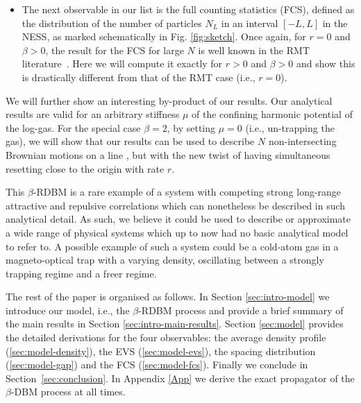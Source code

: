\documentclass[onecolumn,superscriptaddress,
 amsmath,amssymb,
 aps,
 prd,
]{revtex4-1}
\begin{document}
\begin{itemize}
\item The next observable in our list is the full counting statistics (FCS), defined as the distribution of the number of particles $N_L$ in an interval $[-L,L]$ 
in the NESS, as marked schematically in Fig. \ref{fig:sketch}. Once again, for $r=0$ and $\beta >0$, the result for the FCS for large $N$ is well known in the RMT literature~\cite{DM63,CL95,FS95,MMSV14,CLM15,MMSV16}. Here we will compute it exactly for $r>0$ and $\beta > 0$ and show this is drastically different from that of the RMT case (i.e., $r=0$). 

\end{itemize}

We will further show an interesting by-product of our results. Our analytical results are valid for an arbitrary stiffness $\mu$ of the confining harmonic potential of the log-gas. For the special case $\beta = 2$, by setting $\mu = 0$ (i.e., un-trapping the gas), we will show that our results can be used to describe $N$ non-intersecting Brownian motions on a line \cite{M1984,SMCR08,Bor09,RS11,GMS21}, but with the new twist of having simultaneous resetting close to the origin with rate $r$. 

{\color{blue}
This $\beta$-RDBM is a rare example of a system with competing strong long-range attractive and repulsive correlations which can nonetheless be described in such analytical detail. As such, we believe it could be used to describe or approximate a wide range of physical systems which up to now had no basic analytical model to refer to. A possible example of such a system could be a cold-atom gas in a magneto-optical trap with a varying density, oscillating between a strongly trapping regime and a freer regime. 
}



\vspace{0.1cm}
%
The rest of the paper is organised as follows. In Section \ref{sec:intro-model} we introduce our model, i.e., the $\beta$-RDBM process
and provide a brief summary of the main results in Section \ref{sec:intro-main-results}. Section \ref{sec:model} provides the detailed derivations for the four observables: the average density profile (\ref{sec:model-density}), the EVS (\ref{sec:model-evs}), the spacing distribution (\ref{sec:model-gap}) and the FCS (\ref{sec:model-fcs}). Finally we conclude in Section~\ref{sec:conclusion}. In Appendix \ref{App} we derive the exact propagator of the $\beta$-DBM process at all times. 
\end{document}
